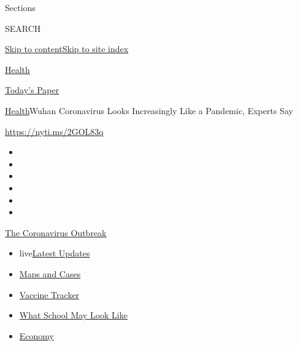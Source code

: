 Sections

SEARCH

\protect\hyperlink{site-content}{Skip to
content}\protect\hyperlink{site-index}{Skip to site index}

\href{https://www.nytimes3xbfgragh.onion/section/health}{Health}

\href{https://myaccount.nytimes3xbfgragh.onion/auth/login?response_type=cookie\&client_id=vi}{}

\href{https://www.nytimes3xbfgragh.onion/section/todayspaper}{Today's
Paper}

\href{/section/health}{Health}\textbar{}Wuhan Coronavirus Looks
Increasingly Like a Pandemic, Experts Say

\url{https://nyti.ms/2GOL83q}

\begin{itemize}
\item
\item
\item
\item
\item
\item
\end{itemize}

\href{https://www.nytimes3xbfgragh.onion/news-event/coronavirus?action=click\&pgtype=Article\&state=default\&region=TOP_BANNER\&context=storylines_menu}{The
Coronavirus Outbreak}

\begin{itemize}
\tightlist
\item
  live\href{https://www.nytimes3xbfgragh.onion/2020/08/01/world/coronavirus-covid-19.html?action=click\&pgtype=Article\&state=default\&region=TOP_BANNER\&context=storylines_menu}{Latest
  Updates}
\item
  \href{https://www.nytimes3xbfgragh.onion/interactive/2020/us/coronavirus-us-cases.html?action=click\&pgtype=Article\&state=default\&region=TOP_BANNER\&context=storylines_menu}{Maps
  and Cases}
\item
  \href{https://www.nytimes3xbfgragh.onion/interactive/2020/science/coronavirus-vaccine-tracker.html?action=click\&pgtype=Article\&state=default\&region=TOP_BANNER\&context=storylines_menu}{Vaccine
  Tracker}
\item
  \href{https://www.nytimes3xbfgragh.onion/interactive/2020/07/29/us/schools-reopening-coronavirus.html?action=click\&pgtype=Article\&state=default\&region=TOP_BANNER\&context=storylines_menu}{What
  School May Look Like}
\item
  \href{https://www.nytimes3xbfgragh.onion/live/2020/07/31/business/stock-market-today-coronavirus?action=click\&pgtype=Article\&state=default\&region=TOP_BANNER\&context=storylines_menu}{Economy}
\end{itemize}

